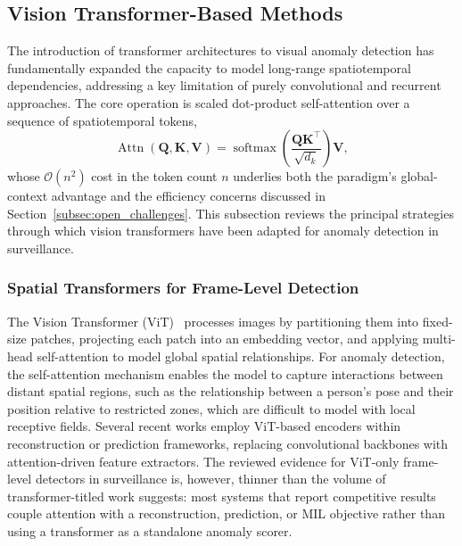\documentclass[10pt,a4paper]{article}
\begin{document}
\subsection{Vision Transformer-Based Methods}
\label{subsec:vit_methods}

The introduction of transformer architectures to visual anomaly detection has fundamentally expanded the capacity to model long-range spatiotemporal dependencies, addressing a key limitation of purely convolutional and recurrent approaches. The core operation is scaled dot-product self-attention over a sequence of spatiotemporal tokens,
\begin{equation}
    \operatorname{Attn}(\mathbf{Q}, \mathbf{K}, \mathbf{V}) = \operatorname{softmax}\!\left( \frac{\mathbf{Q}\mathbf{K}^{\top}}{\sqrt{d_k}} \right)\mathbf{V}, \label{eq:attention}
\end{equation}
whose $\mathcal{O}(n^2)$ cost in the token count $n$ underlies both the paradigm's global-context advantage and the efficiency concerns discussed in Section~\ref{subsec:open_challenges}. This subsection reviews the principal strategies through which vision transformers have been adapted for anomaly detection in surveillance.

\subsubsection{Spatial Transformers for Frame-Level Detection}

The Vision Transformer (ViT)~\citep{dosovitskiy2020image} processes images by partitioning them into fixed-size patches, projecting each patch into an embedding vector, and applying multi-head self-attention to model global spatial relationships. For anomaly detection, the self-attention mechanism enables the model to capture interactions between distant spatial regions, such as the relationship between a person's pose and their position relative to restricted zones, which are difficult to model with local receptive fields. Several recent works employ ViT-based encoders within reconstruction or prediction frameworks, replacing convolutional backbones with attention-driven feature extractors. The reviewed evidence for ViT-only frame-level detectors in surveillance is, however, thinner than the volume of transformer-titled work suggests: most systems that report competitive results couple attention with a reconstruction, prediction, or MIL objective rather than using a transformer as a standalone anomaly scorer.
\end{document}
